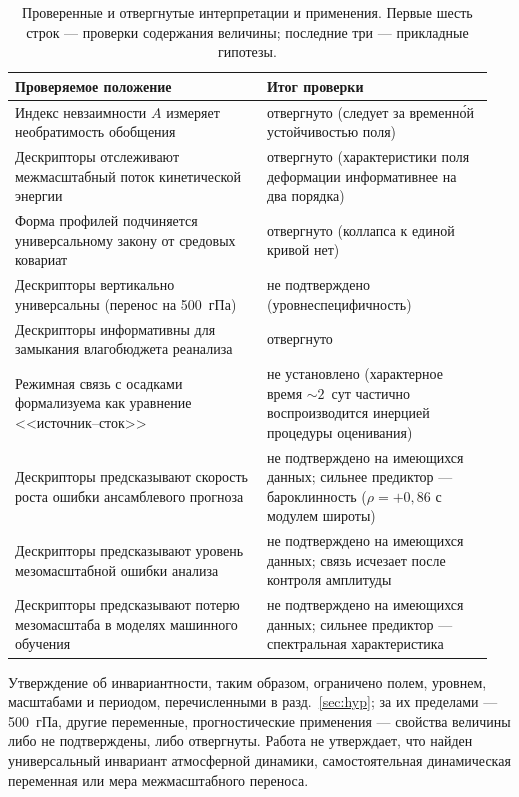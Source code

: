 \documentclass[11pt,a4paper]{article}
\begin{document}
\begin{table}[tbp]
\centering\small
\caption{Проверенные и отвергнутые интерпретации и применения. Первые шесть строк --- проверки содержания величины; последние три --- прикладные гипотезы.}
\label{tab:rejected}
\begin{tabular}{@{}p{0.5\linewidth}p{0.45\linewidth}@{}}
\toprule
Проверяемое положение & Итог проверки\\
\midrule
Индекс невзаимности $A$ измеряет необратимость обобщения & отвергнуто (следует за временн\'{о}й устойчивостью поля)\\
Дескрипторы отслеживают межмасштабный поток кинетической энергии \cite{Germano1992,Aluie2018} & отвергнуто (характеристики поля деформации информативнее на два порядка)\\
Форма профилей подчиняется универсальному закону от средовых ковариат & отвергнуто (коллапса к единой кривой нет)\\
Дескрипторы вертикально универсальны (перенос на 500~гПа) & не подтверждено (уровнеспецифичность)\\
Дескрипторы информативны для замыкания влагобюджета реанализа \cite{Trenberth1991,Mayer2021} & отвергнуто\\
Режимная связь с осадками формализуема как уравнение <<источник--сток>> \cite{Masunaga2012,PetersNeelin2006} & не установлено (характерное время ${\sim}2$~сут частично воспроизводится инерцией процедуры оценивания)\\
Дескрипторы предсказывают скорость роста ошибки ансамблевого прогноза & не подтверждено на имеющихся данных; сильнее предиктор --- бароклинность ($\rho=+0{,}86$ с модулем широты)\\
Дескрипторы предсказывают уровень мезомасштабной ошибки анализа & не подтверждено на имеющихся данных; связь исчезает после контроля амплитуды\\
Дескрипторы предсказывают потерю мезомасштаба в моделях машинного обучения \cite{Lam2023,Bi2023,Price2025,Rasp2024} & не подтверждено на имеющихся данных; сильнее предиктор --- спектральная характеристика\\
\bottomrule
\end{tabular}
\end{table}

Утверждение об инвариантности, таким образом, ограничено полем, уровнем, масштабами и периодом, перечисленными в разд.~\ref{sec:hyp}; за их пределами --- 500~гПа, другие переменные, прогностические применения --- свойства величины либо не подтверждены, либо отвергнуты. Работа не утверждает, что найден универсальный инвариант атмосферной динамики, самостоятельная динамическая переменная или мера межмасштабного переноса.
\end{document}
